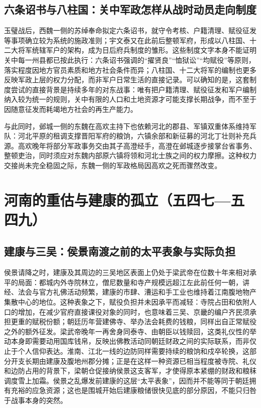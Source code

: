 \subsection{六条诏书与八柱国：关中军政怎样从战时动员走向制度}

玉璧战后，西魏一侧的苏绰奉命拟定六条诏书，就守令考核、户籍清理、赋役征发等事项确立较为系统的施政准则；宇文泰又在此前后整顿军府，形成以八柱国、十二大将军统辖军户的架构，成为日后府兵制度的雏形。这些制度文字本身不能证明关中每一州县都已按此执行：六条诏书强调的“擢贤良”“恤狱讼”“均赋役”等原则，落实程度因地方官员素质和地方社会条件而异；八柱国、十二大将军的编制也更多反映军政上层的权力分配，而非军户日常生活的直接记录。可以确知的是，这套制度尝试的直接背景是持续多年的对东战事：唯有把户籍清理、赋役征发和军户编制纳入较为统一的规则，关中有限的人口和土地资源才可能支撑长期战争，而不至于因随意征发而耗竭地方社会的再生产能力。

与此同时，邺城一侧的东魏在高欢主持下也依赖河北的郡县、军镇双重体系维持军队：河北平原的租调支撑晋阳军府的粮饷，六镇余部和新征募的河北丁壮则补充兵源。高欢晚年将部分军政事务交由其子高澄经手，高澄在邺城逐步接掌台省事务、整顿吏治，同时须应对东魏内部原六镇将领和河北士族之间的权力摩擦。这种权力交接尚未完全稳固之际，东魏一侧的军政格局因高欢之死而骤然改变。

\section{河南的重估与建康的孤立（五四七—五四九）}

\subsection{建康与三吴：侯景南渡之前的太平表象与实际负担}

侯景请降之时，建康及其周边的三吴地区表面上仍处于梁武帝在位数十年来相对承平的局面：都城内外寺院林立，僧尼数量和寺产规模远超江左此前任何一朝，讲经、法会与官方礼佛活动频繁，建康的市肆、漕运和手工业也维持着江南腹地物产集散中心的地位。这种表象之下，赋役负担并未因承平而减轻：寺院占田和依附人口的增加，在减少官府直接课役对象的同时，也意味着三吴、京畿的编户齐民须承担更重的赋税份额；朝廷历年营建佛寺、举办法会耗费的钱粮，同样出自正常赋役之外的额外征发。梁武帝晚年一再舍身同泰寺、由朝臣以钱赎回，这类礼仪性的举动本身即需要动用国库钱帛，反映出佛教活动同朝廷财政之间的实际联系，而非仅止于个人信仰表达。淮南、江北一线的边防同样需要持续的粮饷和戍卒轮换，这部分开支长期由建康及腹地州郡分摊；正是在这样一种资源已相当程度被寺院、礼仪和边防占用的背景下，梁朝仓促接纳侯景这支客军，才使得原本紧绷的财政和粮秣调度雪上加霜。侯景之乱爆发前建康的这层“太平表象”，因而并不能等同于朝廷拥有充裕的应急资源；这也是围城开始后建康粮储很快见底的部分原因，不能只归咎于战事本身的突然。

